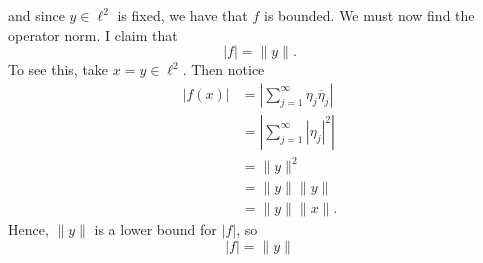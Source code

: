 \documentclass{article}
\begin{document}
\begin{itemize}
    and since $y\in \ell^2$ is fixed, we have that $f$ is bounded. We must now find the operator norm. I claim that 
    \[|f| = \|y\|.\]
    To see this, take $x = y \in \ell^2$. Then notice
    \begin{align*}
        |f(x)| &= \left|\sum_{j = 1}^{\infty}\eta_j\overline{\eta}_j\right|\\
        &= \left|\sum_{j = 1}^{\infty} |\eta_j|^2\right|\\
        &= \|y\|^2\\
        &= \|y\|\|y\|\\
        &= \|y\|\|x\|. 
    \end{align*}
    Hence, $\|y\|$ is a lower bound for $|f|$, so
    \[|f| = \|y\|\]
    
\end{itemize}
\end{document}
